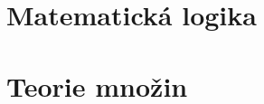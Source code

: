 \chapter{Matematická logika}
\label{chap:matematicka-logika}


\chapter{Teorie množin}
\label{chap:teorie-mnozin}

